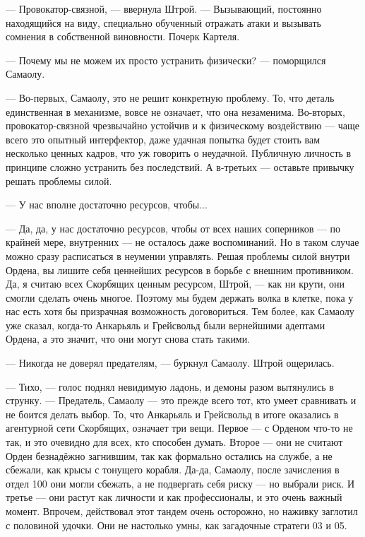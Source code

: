 --- Провокатор-связной, --- ввернула Штрой.
--- Вызывающий, постоянно находящийся на виду, специально обученный отражать атаки и вызывать сомнения в собственной виновности.
Почерк Картеля.

--- Почему мы не можем их просто устранить физически? --- поморщился Самаолу.

--- Во-первых, Самаолу, это не решит конкретную проблему.
То, что деталь единственная в механизме, вовсе не означает, что она незаменима.
Во-вторых, провокатор-связной чрезвычайно устойчив и к физическому воздействию --- чаще всего это опытный интерфектор, даже удачная попытка будет стоить вам несколько ценных кадров, что уж говорить о неудачной.
Публичную личность в принципе сложно устранить без последствий.
А в-третьих --- оставьте привычку решать проблемы силой.

--- У нас вполне достаточно ресурсов, чтобы...

--- Да, да, у нас достаточно ресурсов, чтобы от всех наших соперников --- по крайней мере, внутренних --- не осталось даже воспоминаний.
Но в таком случае можно сразу расписаться в неумении управлять.
Решая проблемы силой внутри Ордена, вы лишите себя ценнейших ресурсов в борьбе с внешним противником.
Да, я считаю всех Скорбящих ценным ресурсом, Штрой, --- как ни крути, они смогли сделать очень многое.
Поэтому мы будем держать волка в клетке, пока у нас есть хотя бы призрачная возможность договориться.
Тем более, как Самаолу уже сказал, когда-то Анкарьяль и Грейсвольд были вернейшими адептами Ордена, а это значит, что они могут снова стать такими.

--- Никогда не доверял предателям, --- буркнул Самаолу.
Штрой ощерилась.

--- Тихо, --- голос поднял невидимую ладонь, и демоны разом вытянулись в струнку.
--- Предатель, Самаолу --- это прежде всего тот, кто умеет сравнивать и не боится делать выбор.
То, что Анкарьяль и Грейсвольд в итоге оказались в агентурной сети Скорбящих, означает три вещи.
Первое --- с Орденом что-то не так, и это очевидно для всех, кто способен думать.
Второе --- они не считают Орден безнадёжно загнившим, так как формально остались на службе, а не сбежали, как крысы с тонущего корабля.
Да-да, Самаолу, после зачисления в отдел 100 они могли сбежать, а не подвергать себя риску --- но выбрали риск.
И третье --- они растут как личности и как профессионалы, и это очень важный момент.
Впрочем, действовал этот тандем очень осторожно, но наживку заглотил с половиной удочки.
Они не настолько умны, как загадочные стратеги 03 и 05.


